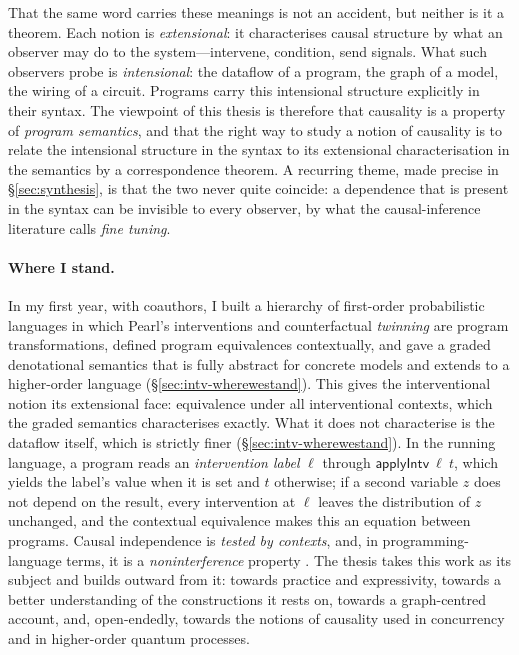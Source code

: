 That the same word carries these meanings is not an accident, but neither is it a theorem. Each notion is \emph{extensional}: it characterises causal structure by what an observer may do to the system---intervene, condition, send signals. What such observers probe is \emph{intensional}: the dataflow of a program, the graph of a model, the wiring of a circuit. Programs carry this intensional structure explicitly in their syntax. The viewpoint of this thesis is therefore that causality is a property of \emph{program semantics}, and that the right way to study a notion of causality is to relate the intensional structure in the syntax to its extensional characterisation in the semantics by a correspondence theorem. A recurring theme, made precise in \S\ref{sec:synthesis}, is that the two never quite coincide: a dependence that is present in the syntax can be invisible to every observer, by what the causal-inference literature calls \emph{fine tuning}.

\paragraph{Where I stand.}
In my first year, with coauthors, I built a hierarchy of first-order probabilistic languages in which Pearl's interventions and counterfactual \emph{twinning} are program transformations, defined program equivalences contextually, and gave a graded denotational semantics that is fully abstract for concrete models and extends to a higher-order language (\S\ref{sec:intv-wherewestand}). This gives the interventional notion its extensional face: equivalence under all interventional contexts, which the graded semantics characterises exactly. What it does not characterise is the dataflow itself, which is strictly finer (\S\ref{sec:intv-wherewestand}). In the running language, a program reads an \emph{intervention label} $\ell$ through $\mathsf{applyIntv}\ \ell\ t$, which yields the label's value when it is set and $t$ otherwise; if a second variable $z$ does not depend on the result, every intervention at $\ell$ leaves the distribution of $z$ unchanged, and the contextual equivalence makes this an equation between programs. Causal independence is \emph{tested by contexts}, and, in programming-language terms, it is a \emph{noninterference} property \cite{goguen1982noninterference}. The thesis takes this work as its subject and builds outward from it: towards practice and expressivity, towards a better understanding of the constructions it rests on, towards a graph-centred account, and, open-endedly, towards the notions of causality used in concurrency and in higher-order quantum processes.

